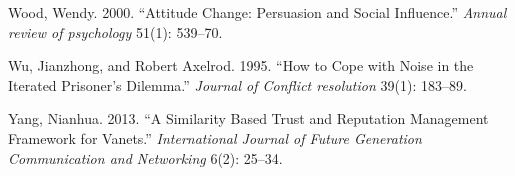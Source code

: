 \documentclass[11pt]{article}
\begin{document}
\leavevmode\hypertarget{ref-wood2000attitude}{}%
Wood, Wendy. 2000. ``Attitude Change: Persuasion and Social Influence.''
\emph{Annual review of psychology} 51(1): 539--70.

\leavevmode\hypertarget{ref-wu1995cope}{}%
Wu, Jianzhong, and Robert Axelrod. 1995. ``How to Cope with Noise in the
Iterated Prisoner's Dilemma.'' \emph{Journal of Conflict resolution}
39(1): 183--89.

\leavevmode\hypertarget{ref-yang2013similarity}{}%
Yang, Nianhua. 2013. ``A Similarity Based Trust and Reputation
Management Framework for Vanets.'' \emph{International Journal of Future
Generation Communication and Networking} 6(2): 25--34.
\end{document}
